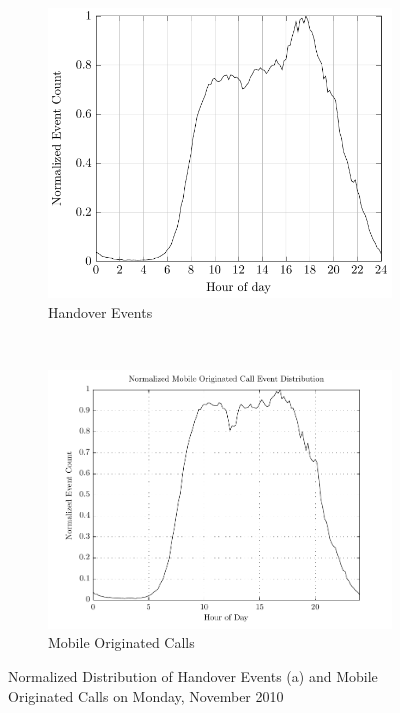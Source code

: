 \documentclass[master,english]{hgbthesis}
\begin{document}
\begin{figure}
	\centering
	\begin{subfigure}[b]{0.5\textwidth}
		\includegraphics[width=\textwidth]{hauf_event_32_time_mat}
		\caption{Handover Events}
		\label{fig:disthandover}
	\end{subfigure}%
	~ %
	\begin{subfigure}[b]{0.5\textwidth}
		\includegraphics[width=\textwidth]{hauf_event_34_time_mat}
		\caption{Mobile Originated Calls}
		\label{fig:distmoc}
	\end{subfigure}
	\caption{Normalized Distribution of Handover Events (a) and Mobile Originated Calls on Monday,  November 2010}\label{fig:distevents}
\end{figure}
\end{document}
